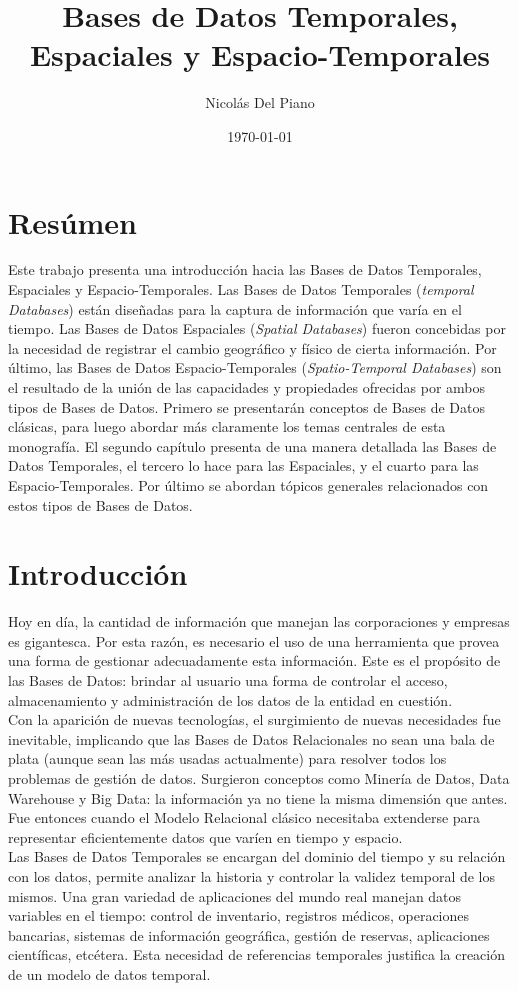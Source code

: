 \documentclass[a4paper,12pt,oneside]{report}
\title{Bases de Datos Temporales, Espaciales y Espacio-Temporales}
\date{\today}
\author{Nicol\'as Del Piano}
\date{}
\newcommand{\mychapter}[2]{
    \setcounter{chapter}{#1}
    \setcounter{section}{0}
    \chapter*{#2}
    \addcontentsline{toc}{chapter}{#2}
}
\begin{document}
\maketitle
\tableofcontents
\newpage

\mychapter{0}{Res\'umen}
Este trabajo presenta una introducci\'on hacia las Bases de Datos Temporales, Espaciales y Espacio-Temporales. Las Bases de Datos Temporales (\textit{temporal Databases}) est\'an dise\~nadas para la captura de informaci\'on que var\'ia en el tiempo. Las Bases de Datos Espaciales (\textit{Spatial Databases}) fueron concebidas por la necesidad de registrar el cambio geogr\'afico y f\'isico de cierta informaci\'on. Por \'ultimo, las Bases de Datos Espacio-Temporales (\textit{Spatio-Temporal Databases}) son el resultado de la uni\'on de las capacidades y propiedades ofrecidas por ambos tipos de Bases de Datos. Primero se presentar\'an conceptos de Bases de Datos cl\'asicas, para luego abordar m\'as claramente los temas centrales de esta monograf\'ia. El segundo cap\'itulo presenta de una manera detallada las Bases de Datos Temporales, el tercero lo hace para las Espaciales, y el cuarto para las Espacio-Temporales. Por \'ultimo se abordan t\'opicos generales relacionados con estos tipos de Bases de Datos.
\mychapter{1}{Introducci\'on}
Hoy en d\'ia, la cantidad de informaci\'on que manejan las corporaciones y empresas es gigantesca. Por esta raz\'on, es necesario el uso de una herramienta que provea una forma de gestionar adecuadamente esta informaci\'on. Este es el prop\'osito de las Bases de Datos: brindar al usuario una forma de controlar el acceso, almacenamiento y administraci\'on de los datos de la entidad en cuesti\'on.\\
Con la aparici\'on de nuevas tecnolog\'ias, el surgimiento de nuevas necesidades fue inevitable, implicando que las Bases de Datos Relacionales no sean una bala de plata (aunque sean las m\'as usadas actualmente) para resolver todos los problemas de gesti\'on de datos. Surgieron conceptos como Miner\'ia de Datos, Data Warehouse y Big Data: la informaci\'on ya no tiene la misma dimensi\'on que antes. Fue entonces cuando el Modelo Relacional cl\'asico necesitaba extenderse para representar eficientemente datos que var\'ien en tiempo y espacio.\\
Las Bases de Datos Temporales se encargan del dominio del tiempo y su relaci\'on con los datos, permite analizar la historia y controlar la validez temporal de los mismos. Una gran variedad de aplicaciones del mundo real manejan datos variables en el tiempo: control de inventario, registros m\'edicos, operaciones bancarias, sistemas de informaci\'on geogr\'afica, gesti\'on de reservas, aplicaciones cient\'ificas, etc\'etera. Esta necesidad de referencias temporales justifica la creaci\'on de un modelo de datos temporal.\\
\end{document}
